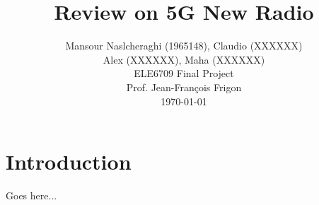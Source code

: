 \documentclass[journal,draftclsnofoot,onecolumn,12pt]{IEEEtran}
\theoremstyle{definition}
\begin{document}
	\graphicspath{{./images/}}
	\title{Review on 5G New Radio \\}
	


	
	\author{ Mansour Naslcheraghi (1965148), Claudio (XXXXXX)\\Alex (XXXXXX), Maha (XXXXXX)\\ ELE6709 Final Project\\ Prof. Jean-François Frigon \\ \today 		
	}

	
	\maketitle
	\thispagestyle{empty}
	\pagestyle{empty}
	
	
	
	
	
	
	
	\newpage
	\tableofcontents
	
	\newpage
\section{Introduction}
Goes here...




\end{document}

